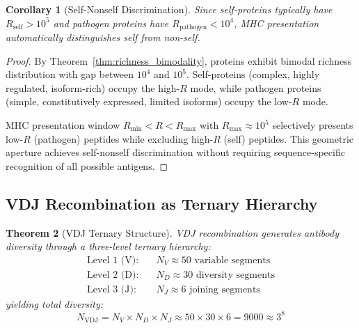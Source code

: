 \documentclass[11pt,twocolumn,a4paper]{article}
\newtheorem{theorem}{Theorem}[section]
\newtheorem{corollary}[theorem]{Corollary}
\theoremstyle{definition}
\theoremstyle{remark}
\begin{document}
\begin{corollary}[Self-Nonself Discrimination]
\label{cor:self_nonself}
Since self-proteins typically have $R_{\mathrm{self}} > 10^5$ and pathogen proteins have $R_{\mathrm{pathogen}} < 10^4$, MHC presentation automatically distinguishes self from non-self.
\end{corollary}

\begin{proof}
By Theorem~\ref{thm:richness_bimodality}, proteins exhibit bimodal richness distribution with gap between $10^4$ and $10^5$. Self-proteins (complex, highly regulated, isoform-rich) occupy the high-$R$ mode, while pathogen proteins (simple, constitutively expressed, limited isoforms) occupy the low-$R$ mode.

MHC presentation window $R_{\min} < R < R_{\max}$ with $R_{\max} \approx 10^5$ selectively presents low-$R$ (pathogen) peptides while excluding high-$R$ (self) peptides. This geometric aperture achieves self-nonself discrimination without requiring sequence-specific recognition of all possible antigens.
\end{proof}

\subsection{VDJ Recombination as Ternary Hierarchy}

\begin{theorem}[VDJ Ternary Structure]
\label{thm:vdj_ternary}
VDJ recombination generates antibody diversity through a three-level ternary hierarchy:
\begin{align}
\text{Level 1 (V):} \quad &N_V \approx 50 \text{ variable segments} \label{eq:v_segments} \\
\text{Level 2 (D):} \quad &N_D \approx 30 \text{ diversity segments} \label{eq:d_segments} \\
\text{Level 3 (J):} \quad &N_J \approx 6 \text{ joining segments} \label{eq:j_segments}
\end{align}
yielding total diversity:
\begin{equation}
N_{\mathrm{VDJ}} = N_V \times N_D \times N_J \approx 50 \times 30 \times 6 = 9000 \approx 3^8
\label{eq:vdj_diversity}
\end{equation}
\end{theorem}
\end{document}
